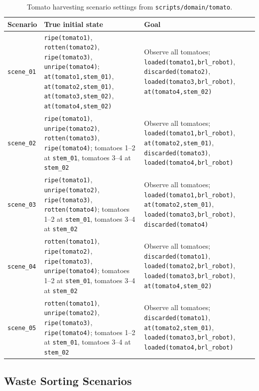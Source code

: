 \begin{table}[H]
\centering
\small
\caption{Tomato harvesting scenario settings from \texttt{scripts/domain/tomato}.}
\label{tab:tomato_scenarios}
\begin{tabularx}{\linewidth}{lXX}
\toprule
Scenario & True initial state & Goal \\
\midrule
\texttt{scene\_01} & \texttt{ripe(tomato1)}, \texttt{rotten(tomato2)}, \texttt{ripe(tomato3)}, \texttt{unripe(tomato4)}; \texttt{at(tomato1,stem\_01)}, \texttt{at(tomato2,stem\_01)}, \texttt{at(tomato3,stem\_02)}, \texttt{at(tomato4,stem\_02)} & Observe all tomatoes; \texttt{loaded(tomato1,brl\_robot)}, \texttt{discarded(tomato2)}, \texttt{loaded(tomato3,brl\_robot)}, \texttt{at(tomato4,stem\_02)} \\
\texttt{scene\_02} & \texttt{ripe(tomato1)}, \texttt{unripe(tomato2)}, \texttt{rotten(tomato3)}, \texttt{ripe(tomato4)}; tomatoes 1--2 at \texttt{stem\_01}, tomatoes 3--4 at \texttt{stem\_02} & Observe all tomatoes; \texttt{loaded(tomato1,brl\_robot)}, \texttt{at(tomato2,stem\_01)}, \texttt{discarded(tomato3)}, \texttt{loaded(tomato4,brl\_robot)} \\
\texttt{scene\_03} & \texttt{ripe(tomato1)}, \texttt{unripe(tomato2)}, \texttt{ripe(tomato3)}, \texttt{rotten(tomato4)}; tomatoes 1--2 at \texttt{stem\_01}, tomatoes 3--4 at \texttt{stem\_02} & Observe all tomatoes; \texttt{loaded(tomato1,brl\_robot)}, \texttt{at(tomato2,stem\_01)}, \texttt{loaded(tomato3,brl\_robot)}, \texttt{discarded(tomato4)} \\
\texttt{scene\_04} & \texttt{rotten(tomato1)}, \texttt{ripe(tomato2)}, \texttt{ripe(tomato3)}, \texttt{unripe(tomato4)}; tomatoes 1--2 at \texttt{stem\_01}, tomatoes 3--4 at \texttt{stem\_02} & Observe all tomatoes; \texttt{discarded(tomato1)}, \texttt{loaded(tomato2,brl\_robot)}, \texttt{loaded(tomato3,brl\_robot)}, \texttt{at(tomato4,stem\_02)} \\
\texttt{scene\_05} & \texttt{rotten(tomato1)}, \texttt{unripe(tomato2)}, \texttt{ripe(tomato3)}, \texttt{ripe(tomato4)}; tomatoes 1--2 at \texttt{stem\_01}, tomatoes 3--4 at \texttt{stem\_02} & Observe all tomatoes; \texttt{discarded(tomato1)}, \texttt{at(tomato2,stem\_01)}, \texttt{loaded(tomato3,brl\_robot)}, \texttt{loaded(tomato4,brl\_robot)} \\
\bottomrule
\end{tabularx}
\end{table}

\subsection{Waste Sorting Scenarios}~\label{app:wastesorting_scenarios}

